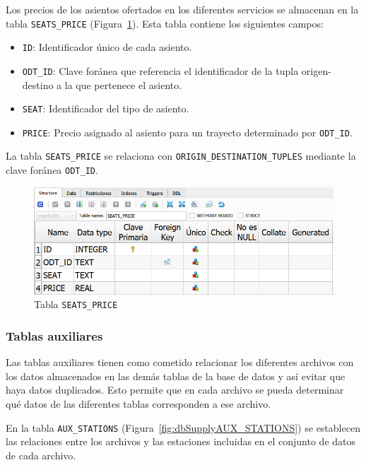 Los precios de los asientos ofertados en los diferentes servicios se almacenan en la tabla \texttt{SEATS\_PRICE} (Figura~\ref{fig:dbSupplySEATS_PRICE}). Esta tabla contiene los siguientes campos:
\begin{itemize}
    \item \texttt{ID}: Identificador único de cada asiento.
    \item \texttt{ODT\_ID}: Clave foránea que referencia el identificador de la tupla origen-destino a la que pertenece el asiento.
    \item \texttt{SEAT}: Identificador del tipo de asiento.
    \item \texttt{PRICE}: Precio asignado al asiento para un trayecto determinado por \texttt{ODT\_ID}.
\end{itemize}

La tabla \texttt{SEATS\_PRICE} se relaciona con \texttt{ORIGIN\_DESTINATION\_TUPLES} mediante la clave foránea \texttt{ODT\_ID}.

\begin{figure}[H]
\centering
\includegraphics[width=.9\textwidth]{fig/Tablas base de datos/Oferta/SEATS_PRICE.png}
\caption{Tabla \texttt{SEATS\_PRICE}}
\label{fig:dbSupplySEATS_PRICE}
\end{figure}

\subsubsection{Tablas auxiliares}

Las tablas auxiliares tienen como cometido relacionar los diferentes archivos con los datos almacenados en las demás tablas de la base de datos y así evitar que haya datos duplicados. Esto permite que en cada archivo se pueda determinar qué datos de las diferentes tablas corresponden a ese archivo.  

En la tabla \texttt{AUX\_STATIONS} (Figura~\ref{fig:dbSupplyAUX_STATIONS}) se establecen las relaciones entre los archivos y las estaciones incluidas en el conjunto de datos de cada archivo. 

